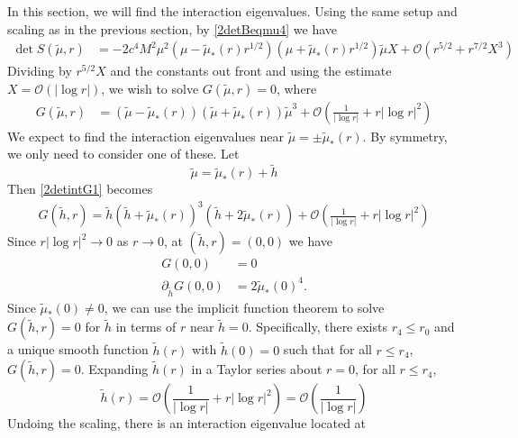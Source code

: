 \documentclass[thesis.tex]{subfiles}
\begin{document}
In this section, we will find the interaction eigenvalues. Using the same setup and scaling as in the previous section, by \cref{2detBeqmu4} we have
\begin{equation}\label{2detint2}
\begin{aligned}
\det S(\tilde{\mu}, r) &= -2 c^4 M^2 \mu^2 (\mu - \tilde{\mu}_*(r)r^{1/2})(\mu + \tilde{\mu}_*(r)r^{1/2}) \tilde{\mu} X + \mathcal{O}\left( r^{5/2} + r^{7/2}X^3 \right)
\end{aligned}
\end{equation}
Dividing by $r^{5/2}X$ and the constants out front and using the estimate $X = \mathcal{O}(|\log r|)$, we wish to solve $G(\tilde{\mu}, r) = 0$, where
\begin{equation}\label{2detintG1}
\begin{aligned}
G(\tilde{\mu}, r) &= (\tilde{\mu} - \tilde{\mu}_*(r)) (\tilde{\mu} + \tilde{\mu}_*(r))\tilde{\mu}^3 + \mathcal{O}\left( \frac{1}{|\log r|} + r |\log r|^2 \right)
\end{aligned}
\end{equation}
We expect to find the interaction eigenvalues near $\tilde{\mu} = \pm \tilde{\mu}_*(r)$. By symmetry, we only need to consider one of these. Let
\[
\tilde{\mu} = \tilde{\mu}_*(r) + \tilde{h}
\]
Then \cref{2detintG1} becomes
\begin{equation}\label{2detintG2}
\begin{aligned}
G(\tilde{h},r) = \tilde{h} ( \tilde{h} + \tilde{\mu}_*(r))^3 (\tilde{h} + 2 \tilde{\mu}_*(r)) + \mathcal{O}\left( \frac{1}{|\log r|} + r |\log r|^2 \right)
\end{aligned}
\end{equation}
Since $r |\log r|^2  \rightarrow 0$ as $r \rightarrow 0$, at $(\tilde{h},r) = (0, 0)$ we have
\begin{align*}
G(0, 0) &= 0 \\
\partial_{\tilde{h}} G(0, 0) &= 2 \tilde{\mu}_*(0)^4.
\end{align*}
Since $\tilde{\mu}_*(0) \neq 0$, we can use the implicit function theorem to solve $G(\tilde{h},r) = 0$ for $\tilde{h}$ in terms of $r$ near $\tilde{h} = 0$. Specifically, there exists $r_4 \leq r_0$ and a unique smooth function $\tilde{h}(r)$ with $\tilde{h}(0) = 0$ such that for all $r \leq r_4$, $G(\tilde{h}, r) = 0$. Expanding $\tilde{h}(r)$ in a Taylor series about $r = 0$, for all $r \leq r_4$,
\[
\tilde{h}(r) = \mathcal{O}\left( \frac{1}{|\log r|} + r |\log r|^2 \right) = \mathcal{O}\left( \frac{1}{|\log r|} \right)
\]
Undoing the scaling, there is an interaction eigenvalue located at
\end{document}

